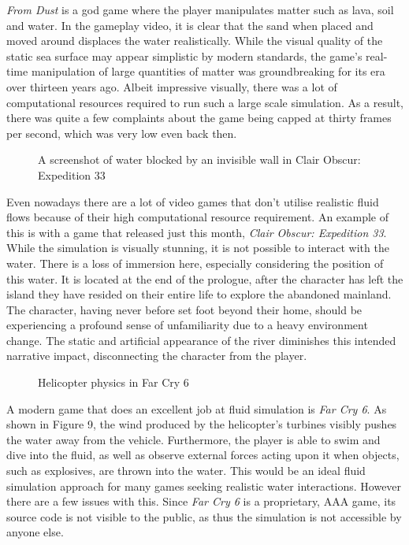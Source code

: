 \documentclass[12pt]{article}
\newcommand{\wideimage}[2][]{%
  \makebox[\textwidth][c]{\texttt{[image: \#2]}}%
}
\begin{document}
    \textit{From Dust}\cite{fromdust} is a god game where the player manipulates matter such as lava, soil and water. In the gameplay video\cite{fromdustvideo}, it is clear that the sand when placed and moved around displaces the water realistically. While the visual quality of the static sea surface may appear simplistic by modern standards, the game's real-time manipulation of large quantities of matter was groundbreaking for its era over thirteen years ago. Albeit impressive visually, there was a lot of computational resources required to run such a large scale simulation. As a result, there was quite a few complaints about the game being capped at thirty frames per second\cite{dsog}, which was very low even back then.
    
    \begin{figure}[H]
        \noindent\wideimage[]{clairObscur.png}
        \caption{A screenshot of water blocked by an invisible wall in Clair Obscur: Expedition 33}
    \end{figure}

    Even nowadays there are a lot of video games that don't utilise realistic fluid flows because of their high computational resource requirement. An example of this is with a game that released just this month, \textit{Clair Obscur: Expedition 33}\cite{clairobscur}.
    While the simulation is visually stunning, it is not possible to interact with the water. There is a loss of immersion here, especially considering the position of this water. It is located at the end of the prologue, after the character has left the island they have resided on their entire life to explore the abandoned mainland. The character, having never before set foot beyond their home, should be experiencing a profound sense of unfamiliarity due to a heavy environment change. The static and artificial appearance of the river diminishes this intended narrative impact, disconnecting the character from the player.

    \begin{figure}[H]
        \noindent\wideimage[]{farCry6.png}
        \caption{Helicopter physics in Far Cry 6 \cite{farcry6video}}
    \end{figure}

    A modern game that does an excellent job at fluid simulation is \textit{Far Cry 6}. As shown in Figure 9, the wind produced by the helicopter's turbines visibly pushes the water away from the vehicle. Furthermore, the player is able to swim and dive into the fluid, as well as observe external forces acting upon it when objects, such as explosives, are thrown into the water. This would be an ideal fluid simulation approach for many games seeking realistic water interactions. However there are a few issues with this. Since \textit{Far Cry 6} is a proprietary, AAA game, its source code is not visible to the public, as thus the simulation is not accessible by anyone else.
    
\end{document}

